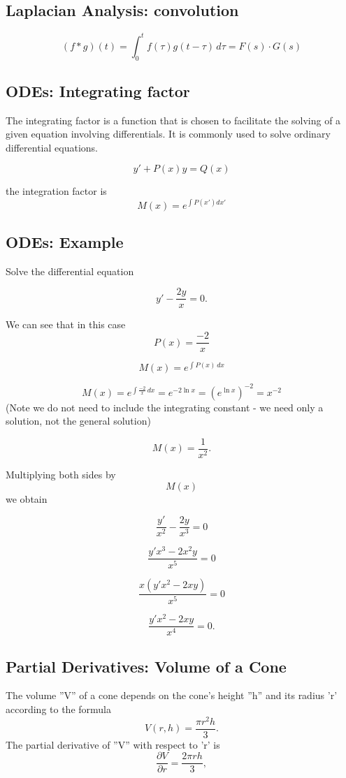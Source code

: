 \documentclass[12pt, a4paper]{article}
\begin{document}
\subsection*{Laplacian Analysis: convolution}

\[ (f * g)(t) = \int_0^t f(\tau)g(t-\tau)\,d\tau= F(s) \cdot G(s) \]

\subsection{ODEs: Integrating factor}
The integrating factor is a function that is chosen to facilitate the solving of a given equation involving differentials. It is commonly used to solve ordinary differential equations.

\[ y'+ P(x)y = Q(x)\]

the integration factor is 
\[M(x) = e^{\int P(x') dx'}\]


\subsection*{ODEs: Example}

Solve the differential equation

\[y'-\frac{2y}{x} = 0.\]

We can see that in this case \[P(x) = \frac{-2}{x}\]

\[ M(x)=e^{\int P(x)\,dx}\]

\[ M(x)=e^{\int \frac{-2}{x}\,dx} = e^{-2 \ln x} = {(e^{\ln x})}^{-2} = x^{-2} \] (Note we do not need to include the integrating constant - we need only a solution, not the general solution)

\[ M(x)=\frac{1}{x^2}.\]

Multiplying both sides by \[M(x)\] we obtain

\[\frac{y'}{x^2} - \frac{2y}{x^3} = 0\]

\[\frac{y'x^3 - 2x^2y}{x^5} = 0\]

\[\frac{x(y'x^2 - 2xy)}{x^5} = 0\]

\[\frac{y'x^2 - 2xy}{x^4} = 0.\]


\subsection{Partial Derivatives: Volume of a Cone}

The volume ''V'' of a cone depends on the cone's height ''h'' and its radius 'r' according to the formula
\[V(r, h) = \frac{\pi r^2 h}{3}.\]
The partial derivative of ''V'' with respect to 'r' is
\[\frac{ \partial V}{\partial r} = \frac{ 2 \pi r h}{3},\]
\end{document}
